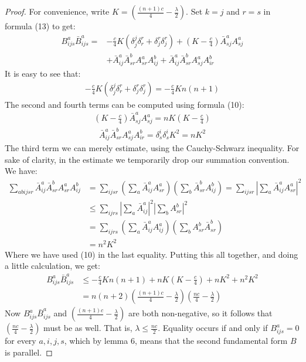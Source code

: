 \begin{proof} For convenience, write $ K =\left( \frac{(n+1)c}{4} - \frac{\lambda}{2} \right)$.  Set $k = j$ and $r = s$ in formula (13) to get:
%
\begin{align*}
B^a_{ijs} \bar{B}^a_{ijs} =& -\frac{c}{4} K ( \delta^j_j \delta^r_r + \delta^r_j \delta^r_j ) + \left( K - \frac{c}{4} \right) \bar{A}^a_{sj} A^a_{sj} \\
&+ \bar{A}^a_{ij} \bar{A}^b_{sr} A^a_{sr} A^b_{ij} + \bar{A}^a_{ij} \bar{A}^b_{sr} A^a_{sj} A^b_{ir}
\end{align*}
%
It is easy to see that:
%
\begin{align*}
-\frac{c}{4} K ( \delta^j_j \delta^r_r + \delta^r_j \delta^r_j ) = -\frac{c}{4} K n (n+1)
\end{align*}
%
The second and fourth terms can be computed using formula (10):
%
\begin{align*}
\left( K - \frac{c}{4} \right) \bar{A}^a_{sj} A^a_{sj} = n K \left( K - \frac{c}{4} \right)
\end{align*}
%
\begin{align*}
\bar{A}^a_{ij} \bar{A}^b_{sr} A^a_{sj} A^b_{ir} = \delta^i_s \delta^i_s K^2 = n K^2
\end{align*}
%
The third term we can merely estimate, using the Cauchy-Schwarz inequality.  For sake of clarity, in the estimate we temporarily drop our summation convention.  We have:
%
\begin{align*}
\sum_{abijsr} \bar{A}^a_{ij} \bar{A}^b_{sr} A^a_{sr} A^b_{ij} &= \sum_{ijsr} \left( \sum_{a} \bar{A}^a_{ij} A^a_{sr} \right)\left( \sum_{b} \bar{A}^b_{sr} A^b_{ij} \right) = \sum_{ijsr} \left| \sum_{a} \bar{A}^a_{ij} A^a_{sr} \right|^2 \\
&\leq \sum_{ijrs} \left| \sum_{a} \bar{A}^a_{ij} \right|^2 \left| \sum_{b}  A^b_{sr} \right|^2 \\
&= \sum_{ijrs} \left( \sum_{a} \bar{A}^a_{ij} A^a_{ij} \right) \left( \sum_{b}  A^b_{sr} \bar{A}^b_{sr} \right)\\
&= n^2 K^2
\end{align*}
%
Where we have used (10) in the last equality.  Putting this all together, and doing a little calculation, we get:
%
\begin{align*}
B^a_{ijs} \bar{B}^a_{ijs} &\leq -\frac{c}{4} K n(n+1) + n K \left( K - \frac{c}{4} \right) + n K^2 + n^2 K^2 \\
&= n(n+2) \left( \frac{(n+1)c}{4} - \frac{\lambda}{2} \right) \left( \frac{nc}{4} - \frac{\lambda}{2} \right)
\end{align*}
%
Now $B^a_{ijs} \bar{B}^a_{ijs}$ and $\left( \frac{(n+1)c}{4} - \frac{\lambda}{2} \right)$ are both non-negative, so it follows that $\left( \frac{nc}{4} - \frac{\lambda}{2} \right)$ must be as well.  That is, $\lambda \leq \frac{nc}{2}$.  Equality occurs if and only if $B^a_{ijs} = 0$ for every $a,i,j,s$, which by lemma 6, means that the second fundamental form $B$ is parallel.
\end{proof}
 
